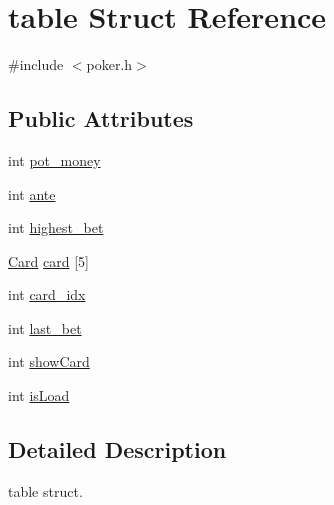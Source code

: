 \hypertarget{structtable}{\section{table Struct Reference}
\label{structtable}
}


{\ttfamily \#include $<$poker.\+h$>$}

\subsection*{Public Attributes}
\begin{DoxyCompactItemize}
\item 
int \hyperlink{structtable_a742ffe5b682ef41e0d5284865d6f9707}{pot\+\_\+money}
\item 
int \hyperlink{structtable_a9bc7be4e5c17f0275b75764d87ac3af7}{ante}
\item 
int \hyperlink{structtable_a50a5836f04eb5607ba290c98aa640767}{highest\+\_\+bet}
\item 
\hyperlink{poker_8h_aacb186b77382a02f7317dc38797f37c2}{Card} \hyperlink{structtable_a949f57fb489ea79e296dbccac40f19b3}{card} \mbox{[}5\mbox{]}
\item 
int \hyperlink{structtable_ae74466d246cfcd247e0c4e49318edf8a}{card\+\_\+idx}
\item 
int \hyperlink{structtable_a4ca9edd8b9f6515674caaf6df7c621c0}{last\+\_\+bet}
\item 
int \hyperlink{structtable_a1d8bc65b5a26f8b5b7a21a2430432901}{show\+Card}
\item 
int \hyperlink{structtable_ab1dd17260b838f195fd032c19bbd7ba5}{is\+Load}
\end{DoxyCompactItemize}


\subsection{Detailed Description}
table struct. 

